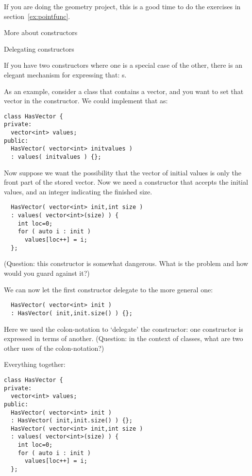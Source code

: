 

\begin{exercise}
  If you are doing the geometry project,
  this is a good time to do the exercises in section~\ref{ex:pointfunc}.
\end{exercise}

 {More about constructors}

 {Delegating constructors}
\label{sec:construct-delegate}

If you have two constructors where one is a special case of the other,
there is an elegant mechanism for expressing that:
s.

As an example, consider a class that contains a vector,
and you want to set that vector in the constructor.
We could implement that as:
\begin{lstlisting}
class HasVector {
private:
  vector<int> values;
public:
  HasVector( vector<int> initvalues )
  : values( initvalues ) {};
\end{lstlisting}
Now suppose we want the possibility that
the vector of initial values
is only the front part of the stored vector.
Now we need a constructor that accepts
the initial values, and an integer indicating
the finished size.
\begin{lstlisting}
  HasVector( vector<int> init,int size )
  : values( vector<int>(size) ) {
    int loc=0;
    for ( auto i : init )
      values[loc++] = i;
  };
\end{lstlisting}
(Question: this constructor is somewhat dangerous.
What is the problem and how would you guard against it?)

We can now let the first constructor delegate to the more general one:
\begin{lstlisting}
  HasVector( vector<int> init )
  : HasVector( init,init.size() ) {};
\end{lstlisting}
Here we used the colon-notation to `delegate' the constructor:
one constructor is expressed in terms of another.
(Question: in the context of classes, what are
two other uses of the colon-notation?)

Everything together:
\begin{lstlisting}
class HasVector {
private:
  vector<int> values;
public:
  HasVector( vector<int> init )
  : HasVector( init,init.size() ) {};
  HasVector( vector<int> init,int size )
  : values( vector<int>(size) ) {
    int loc=0;
    for ( auto i : init )
      values[loc++] = i;
  };
\end{lstlisting}

